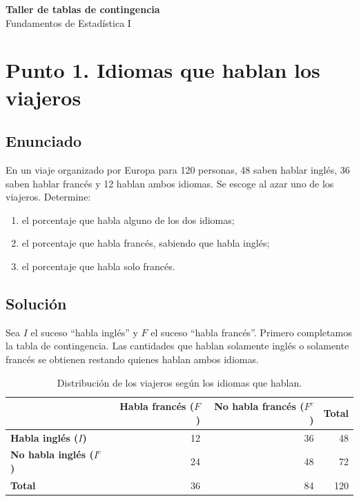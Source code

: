 \documentclass[12pt]{article}
\begin{document}
\begin{center}
    {\Large\textbf{Taller de tablas de contingencia}}\\[0.3em]
    Fundamentos de Estadística I
\end{center}

\section*{Punto 1. Idiomas que hablan los viajeros}

\subsection*{Enunciado}

En un viaje organizado por Europa para 120 personas, 48 saben hablar inglés, 36 saben hablar francés y 12 hablan ambos idiomas. Se escoge al azar uno de los viajeros. Determine:

\begin{enumerate}
    \item el porcentaje que habla alguno de los dos idiomas;
    \item el porcentaje que habla francés, sabiendo que habla inglés;
    \item el porcentaje que habla solo francés.
\end{enumerate}

\subsection*{Solución}

Sea $I$ el suceso ``habla inglés'' y $F$ el suceso ``habla francés''. Primero completamos la tabla de contingencia. Las cantidades que hablan solamente inglés o solamente francés se obtienen restando quienes hablan ambos idiomas.

\begin{table}[H]
\centering
\small
\renewcommand{\arraystretch}{1.15}
\begin{tabular}{|l|r|r|r|}
\hline
 & \textbf{Habla francés ($F$)} & \textbf{No habla francés ($F^c$)} & \textbf{Total} \\ \hline
\textbf{Habla inglés ($I$)} & 12 & 36 & 48 \\ \hline
\textbf{No habla inglés ($I^c$)} & 24 & 48 & 72 \\ \hline
\textbf{Total} & 36 & 84 & 120 \\ \hline
\end{tabular}
\caption{Distribución de los viajeros según los idiomas que hablan.}
\label{tab:idiomas}
\end{table}
\end{document}
